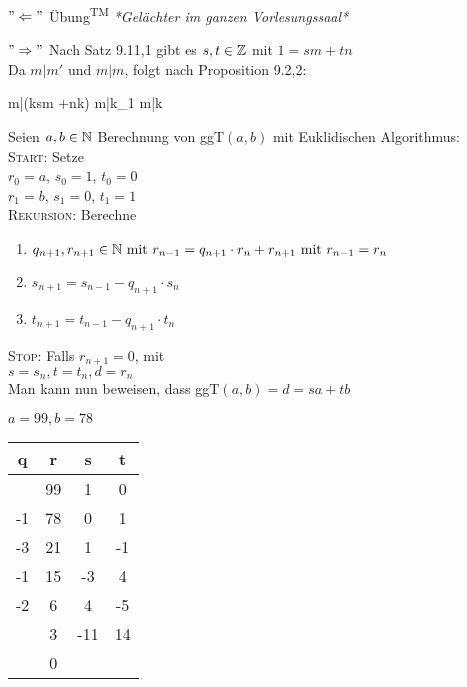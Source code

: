\documentclass{../../meta/tudscript}
\begin{document}

			$"\Leftarrow "$
			Übung\textsuperscript{TM} \textit{*Gelächter im ganzen Vorlesungssaal*}

			$"\Rightarrow "$
			Nach Satz 9.11,1 gibt es $s,t \in \mathbb{Z}$ mit $1=sm+tn$\\
			Da $m|m'$ und $m|m$, folgt nach Proposition 9.2,2:
			\begin{flalign*}
				{m|(ksm +nk) \Rightarrow m|k_{1} \implies m|k}
			\end{flalign*}

		Seien $a,b \in \mathbb{N}$ Berechnung von ggT$(a,b)$ mit Euklidischen Algorithmus:\\

		\textsc{Start}: Setze\\
		$r_0 = a$, $s_0 = 1$, $t_0 = 0$\\
		$r_1 = b$, $s_1 = 0$, $t_1 = 1$\\

		\textsc{Rekursion}: Berechne
		\begin{enumerate}
			\item $q_{n+1}, r_{n+1} \in \mathbb{N} \text{ mit } r_{n-1} = q_{n+1} \cdot r_n + r_{n+1} \text{ mit } r_{n-1} = r_n$
			\item $s_{n+1} = s_{n-1} - q_{n+1} \cdot s_n$
			\item $t_{n+1} = t_{n-1} - q_{n+1} \cdot t_n$
		\end{enumerate}

		\textsc{Stop}: Falls $r_{n+1} = 0$, mit\\
		$s = s_n, t = t_n, d = r_n$\\

		Man kann nun beweisen, dass ggT$(a,b) = d = sa +tb$

		$a = 99, b = 78$

		\begin{tabular}{cc|cc}
			q & r  & s & t \\
			\hline
			   & 99 &  1 &  0 \\
			-1 & 78 &  0 &  1 \\
			-3 & 21 &  1 & -1 \\
			-1 & 15 & -3 &  4 \\
			-2 &  6 &  4 & -5 \\
			   &  3 & -11& 14 \\
			\hline
			& 0 & & \\
		\end{tabular}
\end{document}
